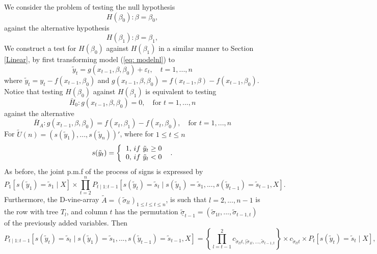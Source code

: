 \documentclass[harvard,11pt]{article}
\begin{document}
We consider the problem of testing the null hypothesis
\begin{equation}\label{eq: nullnl}
H(\beta_0):\beta=\beta_0,
\end{equation}
against the alternative hypothesis
\begin{equation}\label{eq: altnl}
H(\beta_1):\beta=\beta_1,
\end{equation}
We construct a test for $H(\beta_0)$ against $H(\beta_1)$ in a similar manner to Section \ref{Linear}, by first transforming model (\ref{eq: modelnl}) to 
\[
\tilde{y}_t=g(x_{t-1},\beta,\beta_0)+\varepsilon_t,\quad t=1,...,n
\]
where $\tilde{y}_t=y_t-f(x_{t-1},\beta_0)$ and $g(x_{t-1},\beta,\beta_0)=f(x_{t-1},\beta)-f(x_{t-1},\beta_0)$. Notice that testing $H(\beta_0)$ against $H(\beta_1)$ is equivalent to testing
\[
\bar{H}_0:g(x_{t-1}, \beta,\beta_0)=0,\quad\text{for }t=1,...,n
\]
against the alternative
\[
\bar{H}_A: g(x_{t-1},\beta,\beta_0)=f(x_t,\beta_1)-f(x_t,\beta_0),\quad\text{for }t=1,...,n
\]
For $\tilde{U}(n)=(s(\tilde{y}_1),...,s(\tilde{y}_n))'$, where for $1\leq t\leq n$
\begin{equation*}
s(\tilde{y}_{t})=\left\{ 
\begin{tabular}{l}
$1,$ $if$ $\tilde{y}_{t}\geq 0$ \\ 
$0,$ $if$ $\tilde{y}_{t}<0$%
\end{tabular}%
\ \right. \text{.}
\end{equation*}
As before, the joint p.m.f of the process of signs is expressed by
\begin{equation}\label{eq: IDKANYMORE}
P_1[s(\tilde{y}_1)=\tilde{s}_1\mid X]\times\prod\limits_{t=2}^{n}P_{t\mid 1:{t-1}}[s(\tilde{y}_t)=\tilde{s}_t\mid s(\tilde{y}_1)=\tilde{s}_1,...,s(\tilde{y}_{t-1})=\tilde{s}_{t-1},X].
\end{equation}
Furthermore, the D-vine-array $\tilde{A}=(\tilde{\sigma}_{lt})_{1\leq l\leq t\leq n}$, is such that $l=2,...,n-1$ is the row with tree $T_l$, and column $t$ has the permutation $\tilde{\underline{\sigma}}_{t-1}=(\tilde{\sigma}_{1t},...,\tilde{\sigma}_{t-1,t})$ of the previously added variables. Then
\begin{equation}\label{eq: stober2}
P_{t\mid 1:{t-1}}[s(\tilde{y}_t)=\tilde{s}_t\mid s(\tilde{y}_1)=\tilde{s}_1,...,s(\tilde{y}_{t-1})=\tilde{s}_{t-1},X]=\left\{\prod\limits_{l=t-1}^{2} c_{\tilde{\sigma}_{lt}t,\mid \tilde{\sigma}_{1t},...,\tilde{\sigma}_{t-1,t}}\right\}\times c_{\tilde{\sigma}_{lt}t}\times P_t[s(\tilde{y}_t)=\tilde{s}_t\mid X],
\end{equation}
\end{document}
